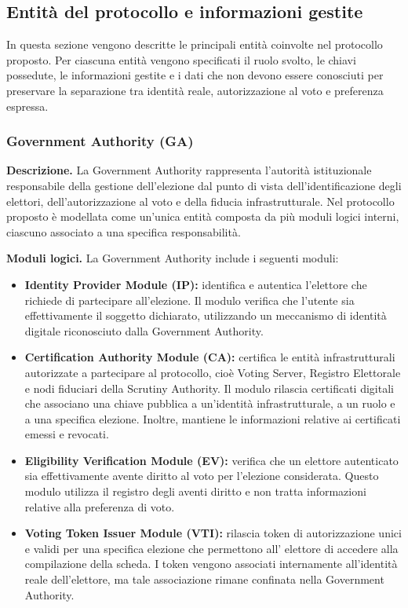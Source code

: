 \documentclass[a4paper,12pt]{article}
\begin{document}
\subsection{Entit\`a del protocollo e informazioni gestite}

In questa sezione vengono descritte le principali entit\`a coinvolte nel protocollo proposto.
Per ciascuna entit\`a vengono specificati il ruolo svolto, le chiavi possedute, le informazioni gestite e i dati che non devono essere conosciuti per preservare la separazione tra identit\`a reale, autorizzazione al voto e preferenza espressa.

\subsubsection{Government Authority (GA)}

\textbf{Descrizione.}
La Government Authority rappresenta l'autorit\`a istituzionale responsabile della gestione dell'elezione dal punto di vista dell'identificazione degli elettori, dell'autorizzazione al voto e della fiducia infrastrutturale.
Nel protocollo proposto è modellata come un'unica entit\`a composta da pi\`u moduli logici interni, ciascuno associato a una specifica responsabilit\`a.

\textbf{Moduli logici.}
La Government Authority include i seguenti moduli:

\begin{itemize}
	\item \textbf{Identity Provider Module (IP):}
	      identifica e autentica l'elettore che richiede di partecipare all'elezione.
	      Il modulo verifica che l'utente sia effettivamente il soggetto dichiarato, utilizzando un meccanismo di identit\`a digitale riconosciuto dalla Government Authority.

	\item \textbf{Certification Authority Module (CA):}
	      certifica le entit\`a infrastrutturali autorizzate a partecipare al protocollo, cio\`e Voting Server, Registro Elettorale e nodi fiduciari della Scrutiny Authority.
	      Il modulo rilascia certificati digitali che associano una chiave pubblica a un'identit\`a infrastrutturale, a un ruolo e a una specifica elezione.
	      Inoltre, mantiene le informazioni relative ai certificati emessi e revocati.

	\item \textbf{Eligibility Verification Module (EV):}
	      verifica che un elettore autenticato sia effettivamente avente diritto al voto per l'elezione considerata.
	      Questo modulo utilizza il registro degli aventi diritto e non tratta informazioni relative alla preferenza di voto.

	\item \textbf{Voting Token Issuer Module (VTI):}
	      rilascia token di autorizzazione unici e validi per una specifica elezione che permettono all' elettore di accedere alla compilazione della scheda.
	      I token vengono associati internamente all'identit\`a reale dell'elettore, ma tale associazione rimane confinata nella Government Authority.
\end{itemize}
\end{document}
